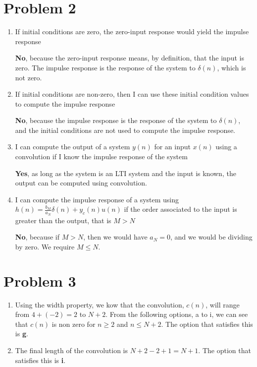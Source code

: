 \documentclass{article}
\begin{document}
\section{Problem 2}
\begin{enumerate}[label=(\alph*)]
    \item If initial conditions are zero, the zero-input response would yield the impulse response
    
    \textbf{No}, because the zero-input response means, by definition, that the input is zero. The impulse response is the response of the system to $\delta(n)$, which is not zero.

    \item If initial conditions are non-zero, then I can use these initial condition values to compute the impulse response 
    
    \textbf{No}, because the impulse response is the response of the system to $\delta(n)$, and the initial conditions are not used to compute the impulse response.

    \item I can compute the output of a system $y(n)$ for an input $x(n)$ using a convolution if I know the impulse response of the system
    
    \textbf{Yes}, as long as the system is an LTI system and the input is known, the output can be computed using convolution.

    \item I can compute the impulse response of a system using $h(n) = \frac{b_M}{a_N}\delta(n) + y_c(n)u(n)$ if the order associated to the input is greater than the output, that is $M > N$

    \textbf{No}, because if $M > N$, then we would have $a_N = 0$, and we would be dividing by zero. We require $M \leq N$.
\end{enumerate}

\section{Problem 3}

\begin{enumerate}[label=(\alph*)]
    \item Using the width property, we kow that the convolution, $c(n)$, will range from $4+(-2) = 2$ to $N+2$. From the following options, a to i, we can see that $c(n)$ is non zero for $n \geq 2$ and $n \leq N+2$. The option that satisfies this is \textbf{g}.
    \item The final length of the convolution is $N+2 - 2 + 1 = N+1$. The option that satisfies this is \textbf{i}.
\end{enumerate}
\end{document}
